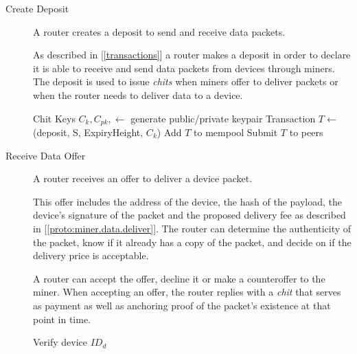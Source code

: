 \documentclass[UTF8, 10pt, nonatbib, nocopyrightspace, reprint]{sigplanconf}
\newenvironment{protocol}[2]{
  \begin{algorithm}[!htb]
    \DontPrintSemicolon
    \caption{#1}\label{#2}
}{
  \end{algorithm}
  \FloatBarrier
}
\newcommand{\protoref}[1]{[\autoref{#1}]}
\newcommand{\secref}[1]{[\autoref{#1}]}
\begin{document}
\begin{description}

\item [Create Deposit] A router creates a deposit to send and receive data packets.

  As described in \secref{transactions} a router makes a deposit in order to declare it is able to receive and send data packets from devices through miners. The deposit is used to issue \emph{chits} when miners offer to deliver packets or when the router needs to deliver data to a device.

    \begin{protocol}{Router Create Deposit}{proto:router.deposit}

       {
        Chit Keys $C_k, C_{pk}, \leftarrow $ generate public/private keypair \;
        Transaction $T \leftarrow $ \Transaction(deposit, S, ExpiryHeight, $C_k$) \;
        Add $T$ to mempool\;
        Submit $T$ to peers\;
      }
    \end{protocol}



  \item [Receive Data Offer] A router receives an offer to deliver a device packet.

    This offer includes the address of the device, the hash of the payload, the device's signature of the packet and the proposed delivery fee as described in \protoref{proto:miner.data.deliver}. The router can determine the authenticity of the packet, know if it already has a copy of the packet, and decide on if the delivery price is acceptable.

    A router can accept the offer, decline it or make a counteroffer to the miner. When accepting an offer, the router replies with a \emph{chit} that serves as payment as well as anchoring proof of the packet's existence at that point in time.

    \begin{protocol}{Router Receive Data Offer}{proto:router.offer.recv}

       {
        Verify device $ID_d$ \;
      }
    \end{protocol}




\end{description}
\end{document}
